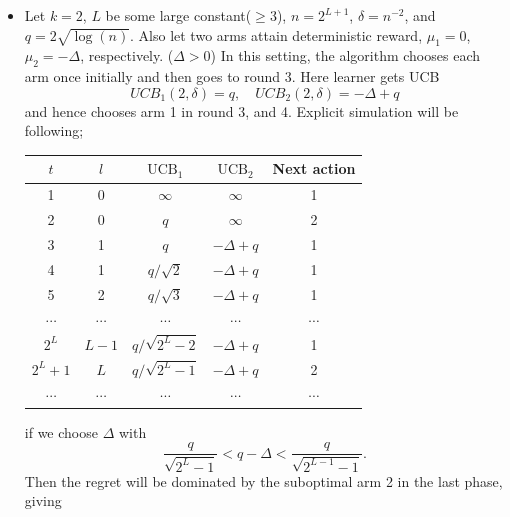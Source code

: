 \documentclass[10pt]{article}
\theoremstyle{definition}
\newenvironment{solution*}[1]{%
  \IfBlankTF{#1}
    {\renewcommand{\themanualsolutioninner}{\unskip}}
    {\renewcommand\themanualsolutioninner{#1}}%
  \manualsolutioninner
}{\endmanualsolutioninner}
\begin{document}
\begin{solution*}{}
    \leavevmode
    \begin{itemize}
        \item[(a)] Let $k = 2$, $L$ be some large constant($\geq 3$), $n=2^{L+1}$, $\delta=n^{-2}$, and $q=2\sqrt{\log(n)}$. 
        Also let two arms attain deterministic reward, $\mu_1 = 0$, $\mu_2 = - \Delta$, respectively. ($\Delta > 0$)
        In this setting, the algorithm chooses each arm once initially and then goes to round 3.
        Here learner gets UCB
        \begin{equation*}
            UCB_1(2, \delta) = q, \quad UCB_2(2, \delta) = -\Delta + q
        \end{equation*}
        and hence chooses arm 1 in round 3, and 4. Explicit simulation will be following;
        \begin{center}
            \begin{tabular}{c|cccc}
                \hline
                $t$ & $l$ & $\text{UCB}_1$ & $\text{UCB}_2$ & Next action \\
                \hline
                1 & 0 & $\infty$ & $\infty$ & 1\\
                2 & 0 & $q$ & $\infty$ & 2\\
                3 & 1 & $q$ & $-\Delta + q$ & 1\\
                4 & 1 & $q/\sqrt{2}$ & $-\Delta + q$ & 1\\
                5 & 2 & $q/\sqrt{3}$ & $-\Delta + q$ & 1\\
                $\cdots$ & $\cdots$ & $\cdots$ & $\cdots$ & $\cdots$ \\
                $2^L$ & $L-1$ & $q/\sqrt{2^L -2}$ & $-\Delta + q$ & 1\\
                $2^L + 1$ & $L$ & $q/\sqrt{2^L -1}$ & $-\Delta + q$ & 2\\
                $\cdots$ & $\cdots$ & $\cdots$ & $\cdots$ & $\cdots$ \\
                \hline
            \end{tabular}
        \end{center}
        if we choose $\Delta$ with
        \begin{equation*}
            \frac{q}{\sqrt{2^L - 1}} < q - \Delta < \frac{q}{\sqrt{2^{L-1} - 1}}.
        \end{equation*}
        Then the regret will be dominated by the suboptimal arm 2 in the last phase, giving
        \begin{equation*}

\end{equation*}
\end{itemize}
\end{solution*}
\end{document}
